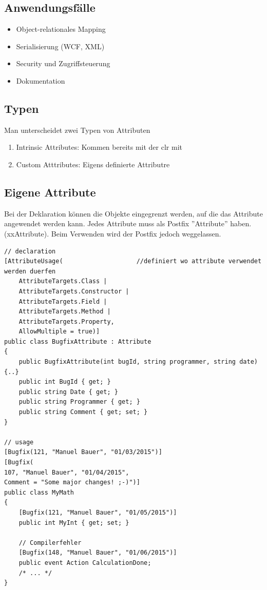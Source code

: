 \documentclass[
a4paper,
oneside,
10pt,
fleqn,
headsepline,
toc=listofnumbered, 
bibliography=totocnumbered]{scrartcl}
\begin{document}
\subsection{Anwendungsfälle}
\begin{itemize}
	\item Object-relationales Mapping
	\item Serialisierung (WCF, XML)
	\item Security und Zugriffsteuerung
	\item Dokumentation
\end{itemize}

\subsection{Typen}
Man unterscheidet zwei Typen von Attributen
\begin{enumerate}
	\item Intrinsic Attributes: Kommen bereits mit der \gls{clr} mit
	\item Custom Atttributes: Eigens definierte Attributre
\end{enumerate}

\clearpage

\subsection{Eigene Attribute}
Bei der Deklaration können die Objekte eingegrenzt werden, auf die das Attribute angewendet werden kann. Jedes Attribute muss als Postfix ''Attribute'' haben. (xxAttribute). Beim Verwenden wird der Postfix jedoch weggelassen.
\begin{lstlisting}
// declaration 
[AttributeUsage(                    //definiert wo attribute verwendet werden duerfen
	AttributeTargets.Class |
	AttributeTargets.Constructor |
	AttributeTargets.Field |
	AttributeTargets.Method |
	AttributeTargets.Property,
	AllowMultiple = true)]
public class BugfixAttribute : Attribute
{
	public BugfixAttribute(int bugId, string programmer, string date) {..}
	public int BugId { get; }
	public string Date { get; }
	public string Programmer { get; }
	public string Comment { get; set; }
}

// usage
[Bugfix(121, "Manuel Bauer", "01/03/2015")]
[Bugfix(
107, "Manuel Bauer", "01/04/2015",
Comment = "Some major changes! ;-)")]
public class MyMath
{
	[Bugfix(121, "Manuel Bauer", "01/05/2015")]
	public int MyInt { get; set; }

	// Compilerfehler
	[Bugfix(148, "Manuel Bauer", "01/06/2015")]
	public event Action CalculationDone;
	/* ... */
}
\end{lstlisting}
\end{document}
